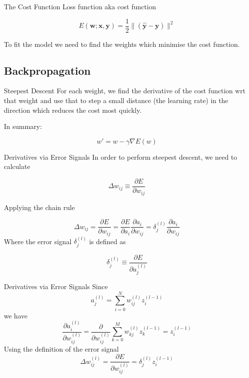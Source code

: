 \documentclass{beamer}
\begin{document}
\begin{frame}[fragile]{The Cost Function}
Loss function aka cost function

$$
E(\boldsymbol{w}; \boldsymbol{x}, \boldsymbol{y}) = \frac{1}{2}\|(\hat{\boldsymbol{y}} - \boldsymbol{y})\|^2
$$

To fit the model we need to find the weights which minimise the cost
function.
\end{frame}

\subsection{Backpropagation}

\begin{frame}[fragile]{Steepest Descent}
For each weight, we find the derivative of the cost function wrt that
weight and use that to step a small distance (the learning rate) in
the direction which reduces the cost most quickly.

In summary:

$$
w' = w - \gamma\nabla E(w)
$$
\end{frame}

\begin{frame}[fragile]{Derivatives via Error Signals}
In order to perform steepest descent, we need to calculate

$$
\Delta w_{ij} \equiv \frac{\partial E}{\partial w_{ij}}
$$

Applying the chain rule

$$
\Delta w_{ij} =
\frac{\partial E}{\partial w_{ij}} =
\frac{\partial E}{\partial a_i}\frac{\partial a_i}{\partial w_{ij}} =
\delta_j^{(l)}\frac{\partial a_i}{\partial w_{ij}}
$$
Where the error signal $\delta_j^{(l)}$ is defined as

$$
\delta_j^{(l)} \equiv
\frac{\partial E}{\partial a_j^{(l)}}
$$
\end{frame}

\begin{frame}[fragile]{Derivatives via Error Signals}
Since
$$
a_j^{(l)} = \sum_{i=0}^N w_{ij}^{(l)}z_i^{(l-1)}
$$
we have
$$
\frac{\partial a_i^{(l)}}{\partial w_{ij}^{(l)}} =
\frac{\partial}{\partial w_{ij}^{(l)}}\sum_{k=0}^M w_{kj}^{(l)}z_k^{(l-1)} =
z_i^{(l-1)}
$$
Using the definition of the error signal
$$
\Delta w_{ij}^{(l)} =
\frac{\partial E}{\partial w_{ij}^{(l)}} =
\delta_j^{(l)} z_i^{(l-1)}
$$
\end{frame}
\end{document}

